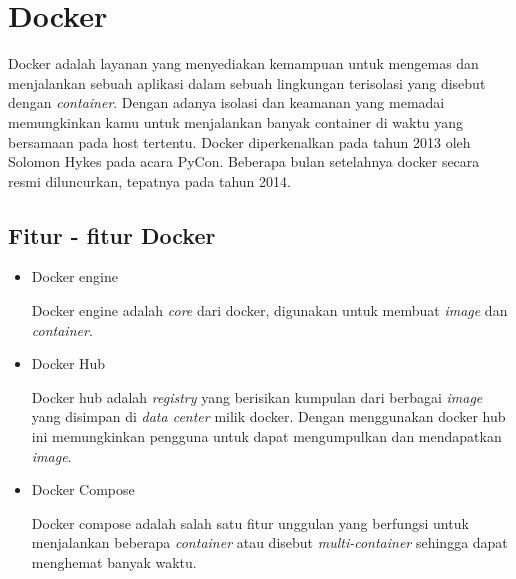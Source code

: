 \section{Docker}
Docker adalah layanan yang menyediakan kemampuan untuk mengemas dan menjalankan sebuah aplikasi dalam sebuah lingkungan terisolasi yang disebut dengan \textit{container}.
Dengan adanya isolasi dan keamanan yang memadai memungkinkan kamu untuk menjalankan banyak container di waktu yang bersamaan pada host tertentu.
Docker diperkenalkan pada tahun 2013 oleh Solomon Hykes pada acara PyCon. Beberapa bulan setelahnya docker secara resmi diluncurkan, tepatnya pada tahun 2014.
\subsection{Fitur - fitur Docker}
\begin{itemize}
  \item Docker engine
  
  Docker engine adalah \textit{core} dari docker, digunakan untuk membuat \textit{image} dan \textit{container}.

  \item Docker Hub
  
  Docker hub adalah \textit{registry} yang berisikan kumpulan dari berbagai \textit{image} yang disimpan di \textit{data center} milik docker.
  Dengan menggunakan docker hub ini memungkinkan pengguna untuk dapat mengumpulkan dan mendapatkan \textit{image}.  

  \item Docker Compose
  
  Docker compose adalah salah satu fitur unggulan yang berfungsi untuk menjalankan beberapa \textit{container} atau disebut \textit{multi-container} sehingga dapat menghemat banyak waktu.

\end{itemize}

